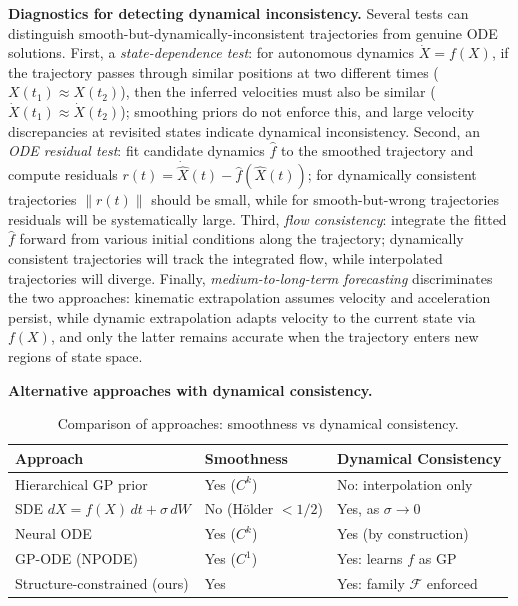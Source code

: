 \documentclass{article}
\theoremstyle{plain}
\theoremstyle{definition}
\theoremstyle{remark}
\begin{document}
\textbf{Diagnostics for detecting dynamical inconsistency.}
Several tests can distinguish smooth-but-dynamically-inconsistent trajectories from genuine ODE solutions.
First, a \emph{state-dependence test}: for autonomous dynamics $\dot{X} = f(X)$, if the trajectory passes through similar positions at two different times ($X(t_1) \approx X(t_2)$), then the inferred velocities must also be similar ($\dot{X}(t_1) \approx \dot{X}(t_2)$); smoothing priors do not enforce this, and large velocity discrepancies at revisited states indicate dynamical inconsistency.
Second, an \emph{ODE residual test}: fit candidate dynamics $\hat{f}$ to the smoothed trajectory and compute residuals $r(t) = \dot{\hat{X}}(t) - \hat{f}(\hat{X}(t))$; for dynamically consistent trajectories $\|r(t)\|$ should be small, while for smooth-but-wrong trajectories residuals will be systematically large.
Third, \emph{flow consistency}: integrate the fitted $\hat{f}$ forward from various initial conditions along the trajectory; dynamically consistent trajectories will track the integrated flow, while interpolated trajectories will diverge.
Finally, \emph{medium-to-long-term forecasting} discriminates the two approaches: kinematic extrapolation assumes velocity and acceleration persist, while dynamic extrapolation adapts velocity to the current state via $f(X)$, and only the latter remains accurate when the trajectory enters new regions of state space.

\textbf{Alternative approaches with dynamical consistency.}

\begin{table}[ht]
\centering
\begin{tabular}{lll}
\toprule
\textbf{Approach} & \textbf{Smoothness} & \textbf{Dynamical Consistency} \\
\midrule
Hierarchical GP prior & Yes ($C^k$) & No: interpolation only \\
SDE $dX = f(X)\,dt + \sigma\,dW$ & No (H\"older $< 1/2$) & Yes, as $\sigma \to 0$ \\
Neural ODE & Yes ($C^k$) & Yes (by construction) \\
GP-ODE (NPODE)~\citep{heinonen2018learning} & Yes ($C^1$) & Yes: learns $f$ as GP \\
Structure-constrained (ours) & Yes & Yes: family $\mathcal{F}$ enforced \\
\bottomrule
\end{tabular}
\caption{Comparison of approaches: smoothness vs dynamical consistency.}
\end{table}
\end{document}
